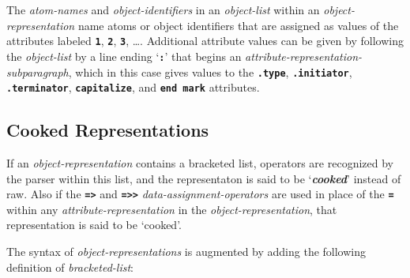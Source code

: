\documentclass[12pt]{article}
\newcommand{\TT}[1]{{\tt \bfseries #1}}
\newcommand{\key}[1]{{\bf \em #1}\index{#1}}
\begin{document}
The {\em atom-names} and {\em object-identifiers} in an {\em object-list}
within an {\em object-representation} name atoms or object identifiers that
are assigned as values of the attributes labeled \TT{1}, \TT{2},
\TT{3}, \ldots.  Additional attribute values can be given by
following the {\em object-list} by a line ending `\TT{:}' that begins an
{\em attribute-representation-subparagraph}, which in this case
gives values to the \TT{.type}, \TT{.initiator}, \TT{.terminator},
\TT{capitalize}, and \TT{end mark} attributes.

\subsection{Cooked Representations}

If an {\em object-representation} contains a bracketed list, operators
are recognized by the parser within this list, and the representaton
is said to be `\key{cooked}' instead of raw.  Also if
the \TT{=>} and \TT{=>{}>} {\em data-assignment-operators}
are used in place of the \TT{=} within any {\em attribute-representation}
in the {\em object-representation}, that representation is
said to be `cooked'.

The syntax of {\em object-representations} is augmented by adding
the following definition of {\em bracketed-list}:
\end{document}
